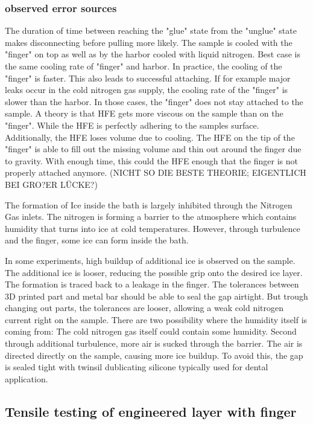 \subsubsection{observed error sources}

The duration of time between reaching the "glue" state from the "unglue" state makes disconnecting before pulling more likely. The sample is cooled with the "finger" on top as well as by the harbor cooled with liquid nitrogen. Best case is the same cooling rate of "finger" and harbor. In practice, the cooling of the "finger" is faster. This also leads to successful attaching. If for example major leaks occur in the cold nitrogen gas supply, the cooling rate of the "finger" is slower than the harbor. In those cases, the "finger" does not stay attached to the sample. A theory is that HFE gets more viscous on the sample than on the "finger". While the HFE is perfectly adhering to the samples surface. Additionally, the HFE loses volume due to cooling. The HFE on the tip of the "finger" is able to fill out the missing volume and thin out around the finger due to gravity. With enough time, this could the HFE enough that the finger is not properly attached anymore. (NICHT SO DIE BESTE THEORIE; EIGENTLICH BEI GRO?ER LÜCKE?)

The formation of Ice inside the bath is largely inhibited through the Nitrogen Gas inlets. The nitrogen is forming a barrier to the atmosphere which contains humidity that turns into ice at cold temperatures. However, through turbulence and the finger, some ice can form inside the bath. 

In some experiments, high buildup of additional ice is observed on the sample. The additional ice is looser, reducing the possible grip onto the desired ice layer. The formation is traced back to a leakage in the finger. The tolerances between 3D printed part and metal bar should be able to seal the gap airtight. But trough changing out parts, the tolerances are looser, allowing a weak cold nitrogen current right on the sample. There are two possibility where the humidity itself is coming from: The cold nitrogen gas itself could contain some humidity. Second through additional turbulence, more air is sucked through the barrier. The air is directed directly on the sample, causing more ice buildup. To avoid this, the gap is sealed tight with twinsil dublicating silicone typically used for dental application.

\subsection{Tensile testing of engineered layer with finger}

